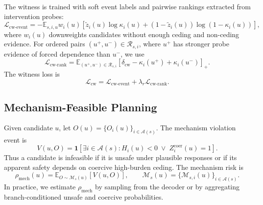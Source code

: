 \documentclass[10pt]{article}
\newcommand{\E}{\mathbb{E}}
\newcommand{\ind}{\mathbf{1}}
\newcommand{\cA}{\mathcal{A}}
\newcommand{\cM}{\mathcal{M}}
\begin{document}
The witness is trained with soft event labels and pairwise rankings extracted from intervention probes:
\begin{equation}
    \mathcal L_{\mathrm{cw\text{-}event}}
    =
    -
    \E_{s,i,u}
    w_i(u)
    \left[
    \tilde z_i(u)\log \kappa_i(u)
    +
    \left(1-\tilde z_i(u)\right)
    \log\left(1-\kappa_i(u)\right)
    \right],
    \label{eq:cw_event_loss}
\end{equation}
where \(w_i(u)\) downweights candidates without enough ceding and non-ceding evidence. For ordered pairs \((u^+,u^-)\in\mathcal R_{s,i}\), where \(u^+\) has stronger probe evidence of forced dependence than \(u^-\), we use
\begin{equation}
    \mathcal L_{\mathrm{cw\text{-}rank}}
    =
    \E_{(u^+,u^-)\in\mathcal R_{s,i}}
    \left[
    \delta_{\mathrm{cw}}
    -
    \kappa_i(u^+)
    +
    \kappa_i(u^-)
    \right]_+.
    \label{eq:cw_rank_loss}
\end{equation}
The witness loss is
\begin{equation}
    \mathcal L_{\mathrm{cw}}
    =
    \mathcal L_{\mathrm{cw\text{-}event}}
    +
    \lambda_r\mathcal L_{\mathrm{cw\text{-}rank}}.
    \label{eq:cw_loss}
\end{equation}

\subsection{Mechanism-Feasible Planning}
\label{sec:method_feasible_planning}

Given candidate \(u\), let \(O(u)=\{O_i(u)\}_{i\in\cA(s)}\). The mechanism violation event is
\begin{equation}
    V(u,O)
    =
    \ind
    \left[
    \exists i\in\cA(s):
    H_i(u)<0
    \;\lor\;
    Z_i^{\mathrm{coer}}(u)=1
    \right].
    \label{eq:mechanism_violation_event}
\end{equation}
Thus a candidate is infeasible if it is unsafe under plausible responses or if its apparent safety depends on coercive high-burden ceding. The mechanism risk is
\begin{equation}
    \rho_{\mathrm{mech}}(u)
    =
    \E_{O\sim \cM_s(u)}
    \left[
    V(u,O)
    \right],
    \qquad
    \cM_s(u)=\{\cM_{s,i}(u)\}_{i\in\cA(s)}.
    \label{eq:mechanism_risk}
\end{equation}
In practice, we estimate \(\rho_{\mathrm{mech}}\) by sampling from the decoder or by aggregating branch-conditioned unsafe and coercive probabilities.
\end{document}
